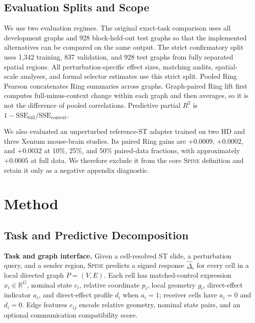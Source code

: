 \documentclass[sigconf,review,balance=false]{acmart}
\newcommand{\methodname}{\textsc{Spine}\xspace}
\begin{document}
\subsection{Evaluation Splits and Scope}
\label{sec:st_microenvironment_mining}
We use two evaluation regimes. The original exact-task comparison uses all
development graphs and 928 block-held-out test graphs so that the implemented
alternatives can be compared on the same output. The strict confirmatory split
uses 1,342 training, 837 validation, and 928 test graphs from fully separated
spatial regions. All perturbation-specific effect sizes, matching audits,
spatial-scale analyses, and formal selector estimates use this strict split.
Pooled Ring Pearson concatenates Ring summaries across graphs. Graph-paired
Ring lift first computes full-minus-context change within each graph and then
averages, so it is not the difference of pooled correlations. Predictive
partial $R^2$ is
$1-\mathrm{SSE}_{\mathrm{full}}/\mathrm{SSE}_{\mathrm{context}}$.

We also evaluated an unperturbed reference-ST adapter trained on two HD and
three Xenium mouse-brain studies. Its paired Ring gains are $+0.0009$,
$+0.0002$, and $+0.0032$ at 10\%, 25\%, and 50\% paired-data fractions, with
approximately $+0.0005$ at full data. We therefore exclude it from the core
\methodname{} definition and retain it only as a negative appendix diagnostic.
\section{Method}
\label{sec:method}

\subsection{Task and Predictive Decomposition}
\label{sec:method_overview}

\noindent\textbf{Task and graph interface.}
Given a cell-resolved ST slide, a perturbation query, and a sender region,
\methodname{} predicts a signed response $\widehat\Delta_i$ for every cell in a
local directed graph $P=(V,E)$. Each cell has matched-control expression
$x_i\in\mathbb{R}^G$, nominal state $c_i$, relative coordinate $p_i$, local
geometry $g_i$, direct-effect indicator $a_i$, and direct-effect profile $d_i$
when $a_i=1$; receiver cells have $a_i=0$ and $d_i=0$. Edge features $e_{ij}$
encode relative geometry, nominal state pairs, and an optional communication
compatibility score.
\end{document}
